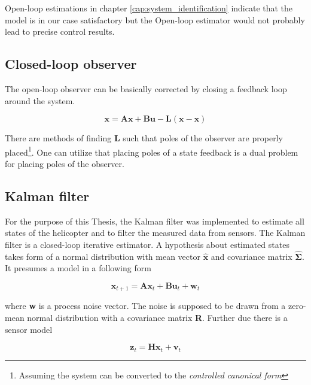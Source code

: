 Open-loop estimations in chapter \ref{cap:system_identification} indicate that the model is in our case satisfactory but the Open-loop estimator would not probably lead to precise control results.

\subsection{Closed-loop observer}

The open-loop observer can be basically corrected by closing a feedback loop around the system.

\begin{equation}
\textbf{\^x} = \textbf{A}\textbf{\^x} + \textbf{B}\textbf{u} - \textbf{L}\left(\textbf{x} - \textbf{\^x}\right)
\end{equation}

There are methods of finding $\textbf{L}$ such that poles of the observer are properly placed\footnote{Assuming the system can be converted to the \textit{controlled canonical form}}. One can utilize that placing poles of a state feedback is a dual problem for placing poles of the observer.

\subsection{Kalman filter}

For the purpose of this Thesis, the Kalman filter was implemented to estimate all states of the helicopter and to filter the measured data from sensors. The Kalman filter is a closed-loop iterative estimator. A hypothesis about estimated states takes form of a normal distribution with mean vector $\hat{\textbf{x}}$ and covariance matrix $\hat{\boldsymbol{\Sigma}}$. It presumes a model in a following form

\begin{equation}
\textbf{x}_{t+1} = \textbf{A}\textbf{x}_t + \textbf{B}\textbf{u}_t + \textbf{w}_t
\end{equation}

where \textbf{w} is a process noise vector. The noise is supposed to be drawn from a zero-mean normal distribution with a covariance matrix \textbf{R}. Further due there is a sensor model

\begin{equation}
\textbf{z}_t = \textbf{H}\textbf{x}_t + \textbf{v}_t
\end{equation}

